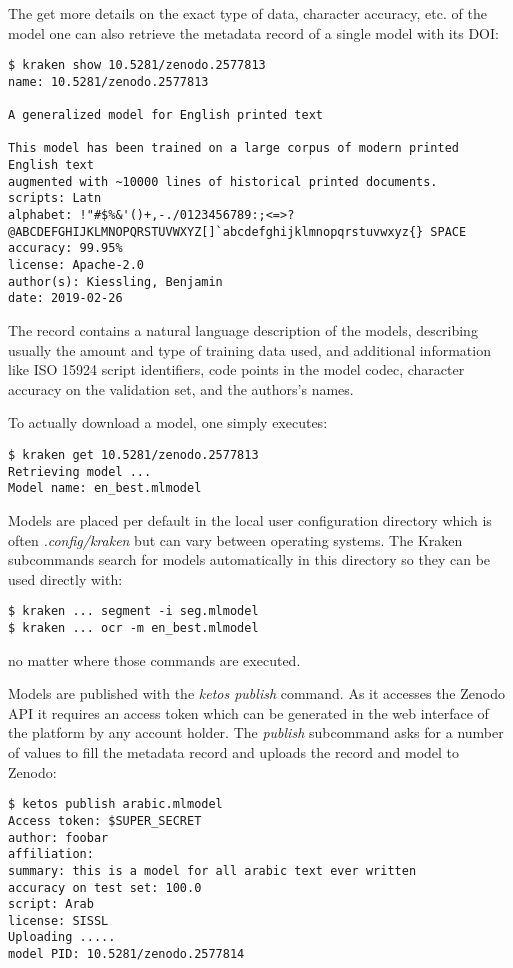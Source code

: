 The get more details on the exact type of data, character accuracy, etc. of the
model one can also retrieve the metadata record of a single model with its DOI:

\begin{verbatim}
$ kraken show 10.5281/zenodo.2577813
name: 10.5281/zenodo.2577813

A generalized model for English printed text

This model has been trained on a large corpus of modern printed English text
augmented with ~10000 lines of historical printed documents.
scripts: Latn
alphabet: !"#$%&'()+,-./0123456789:;<=>?@ABCDEFGHIJKLMNOPQRSTUVWXYZ[]`abcdefghijklmnopqrstuvwxyz{} SPACE
accuracy: 99.95%
license: Apache-2.0
author(s): Kiessling, Benjamin
date: 2019-02-26
\end{verbatim}

The record contains a natural language description of the models, describing
usually the amount and type of training data used, and additional information
like ISO 15924 script identifiers, code points in the model codec, character
accuracy on the validation set, and the authors's names.

To actually download a model, one simply executes:

\begin{verbatim}
$ kraken get 10.5281/zenodo.2577813
Retrieving model ...
Model name: en_best.mlmodel
\end{verbatim}

Models are placed per default in the local user configuration directory which
is often \emph{.config/kraken} but can vary between operating systems. The
Kraken subcommands search for models automatically in this directory so they
can be used directly with:

\begin{verbatim}
$ kraken ... segment -i seg.mlmodel
$ kraken ... ocr -m en_best.mlmodel
\end{verbatim}

no matter where those commands are executed.

Models are published with the \emph{ketos publish} command. As it accesses the
Zenodo API it requires an access token which can be generated in the web
interface of the platform by any account holder. The \emph{publish} subcommand
asks for a number of values to fill the metadata record and uploads the record
and model to Zenodo:

\begin{verbatim}
$ ketos publish arabic.mlmodel
Access token: $SUPER_SECRET
author: foobar
affiliation:
summary: this is a model for all arabic text ever written
accuracy on test set: 100.0
script: Arab
license: SISSL
Uploading .....
model PID: 10.5281/zenodo.2577814
\end{verbatim}

